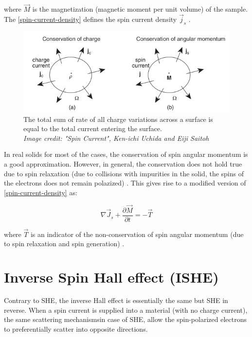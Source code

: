 where $ \vec{M} $ is the magnetization (magnetic moment per unit volume) of the sample. The \cref{spin-current-density} defines the spin current density $ \vec{j}_s $ \cite{Uchida_2016}.

\begin{figure}[h!]
    \includegraphics[width=\columnwidth]{spin-current.png}
    \caption{The total sum of rate of all charge variations across a surface is equal to the total current entering the surface.\\ \vspace{0.2cm} \textit{Image credit: "Spin Current", Ken-ichi Uchida and Eiji Saitoh}}
\end{figure}


In real solids for most of the cases, the conservation of spin angular momentum is a good approximation. However, in general, the conservation does not hold true due to spin relaxation (due to collisions with impurities in the solid, the spins of the electrons does not remain polazized) \cite{Uchida_2016}. This gives rise to a modified version of \cref{spin-current-density} as:

\begin{equation}
    \nabla \vec{J}_s + \frac{\partial \vec{M}}{\partial t} = -\vec{T}
\end{equation}

where $ \vec{T} $ is an indicator of the non-conservation of spin angular momentum (due to spin relaxation and spin generation) \cite{Uchida_2016}.

\section{Inverse Spin Hall effect (ISHE)}

Contrary to SHE, the inverse Hall effect is essentially the same but SHE in reverse. When a spin current is supplied into a material (with no charge current), the same scattering mechanisms\footnotemark[\value{footnote}] in case of SHE, allow the spin-polarized electrons to preferentially scatter into opposite directions.

